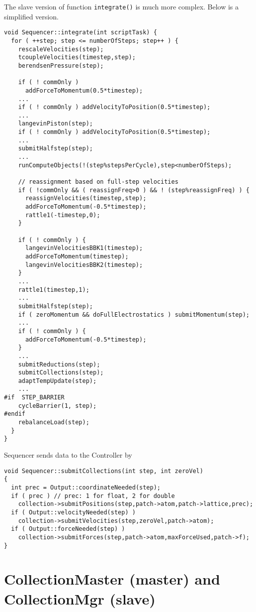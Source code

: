 \documentclass{article}
\begin{document}
The slave version of function \texttt{integrate()}
is much more complex.  Below is a simplified version.

\begin{lstlisting}
void Sequencer::integrate(int scriptTask) {
  for ( ++step; step <= numberOfSteps; step++ ) {
    rescaleVelocities(step);
    tcoupleVelocities(timestep,step);
    berendsenPressure(step);

    if ( ! commOnly )
      addForceToMomentum(0.5*timestep);
    ...
    if ( ! commOnly ) addVelocityToPosition(0.5*timestep);
    ...
    langevinPiston(step);
    if ( ! commOnly ) addVelocityToPosition(0.5*timestep);
    ...
    submitHalfstep(step);
    ...
    runComputeObjects(!(step%stepsPerCycle),step<numberOfSteps);

    // reassignment based on full-step velocities
    if ( !commOnly && ( reassignFreq>0 ) && ! (step%reassignFreq) ) {
      reassignVelocities(timestep,step);
      addForceToMomentum(-0.5*timestep);
      rattle1(-timestep,0);
    }

    if ( ! commOnly ) {
      langevinVelocitiesBBK1(timestep);
      addForceToMomentum(timestep);
      langevinVelocitiesBBK2(timestep);
    }
    ...
    rattle1(timestep,1);
    ...
    submitHalfstep(step);
    if ( zeroMomentum && doFullElectrostatics ) submitMomentum(step);
    ...
    if ( ! commOnly ) {
      addForceToMomentum(-0.5*timestep);
    }
    ...
    submitReductions(step);
    submitCollections(step);
    adaptTempUpdate(step);
    ...
#if  STEP_BARRIER
    cycleBarrier(1, step);
#endif
    rebalanceLoad(step);
  }
}
\end{lstlisting}

Sequencer sends data to the Controller by

\begin{lstlisting}
void Sequencer::submitCollections(int step, int zeroVel)
{
  int prec = Output::coordinateNeeded(step);
  if ( prec ) // prec: 1 for float, 2 for double
    collection->submitPositions(step,patch->atom,patch->lattice,prec);
  if ( Output::velocityNeeded(step) )
    collection->submitVelocities(step,zeroVel,patch->atom);
  if ( Output::forceNeeded(step) )
    collection->submitForces(step,patch->atom,maxForceUsed,patch->f);
}
\end{lstlisting}




\section{\label{sec:collection}CollectionMaster (master) and CollectionMgr (slave)}
\end{document}
